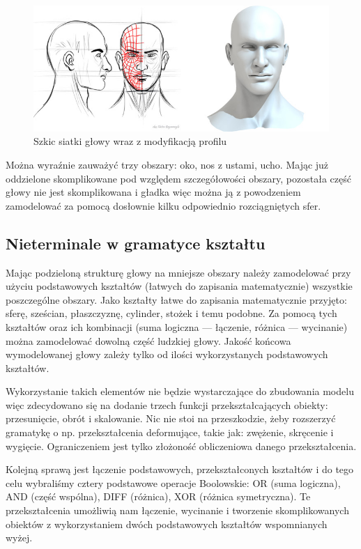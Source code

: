 \begin{figure}
\centering
\includegraphics[width=12cm]{images/face-wire.jpg}
\caption{Szkic siatki głowy wraz z modyfikacją profilu~\cite{bayramoglu}}
\end{figure}

Można wyraźnie zauważyć trzy obszary: oko, nos z ustami, ucho. Mając już
oddzielone skomplikowane pod względem szczegółowości obszary, pozostała część
głowy nie jest skomplikowana i gładka więc można ją z powodzeniem zamodelować za
pomocą dosłownie kilku odpowiednio rozciągniętych sfer.

\subsection{Nieterminale w gramatyce kształtu}
Mając podzieloną strukturę głowy na mniejsze obszary należy zamodelować przy
użyciu podstawowych kształtów (łatwych do zapisania matematycznie) wszystkie
poszczególne obszary. Jako kształty łatwe do zapisania matematycznie
przyjęto: sferę, sześcian, płaszczyznę, cylinder, stożek i temu podobne. Za
pomocą tych kształtów oraz ich kombinacji (suma logiczna --- łączenie, różnica
--- wycinanie) można zamodelować dowolną część ludzkiej głowy. Jakość końcowa
wymodelowanej głowy zależy tylko od ilości wykorzystanych podstawowych
kształtów.

Wykorzystanie takich elementów nie będzie wystarczające do zbudowania modelu
więc zdecydowano się na dodanie trzech funkcji przekształcających obiekty:
przesunięcie, obrót i skalowanie. Nic nie stoi na przeszkodzie, żeby rozszerzyć
gramatykę o np. przekształcenia deformujące, takie jak: zwężenie, skręcenie i
wygięcie. Ograniczeniem jest tylko złożoność obliczeniowa danego
przekształcenia.

Kolejną sprawą jest łączenie podstawowych, przekształconych kształtów i do tego
celu wybraliśmy cztery podstawowe operacje Boolowskie: OR (suma logiczna), AND
(część wspólna), DIFF (różnica), XOR (różnica symetryczna). Te przekształcenia
umożliwią nam łączenie, wycinanie i tworzenie skomplikowanych obiektów z
wykorzystaniem dwóch podstawowych kształtów wspomnianych wyżej.

